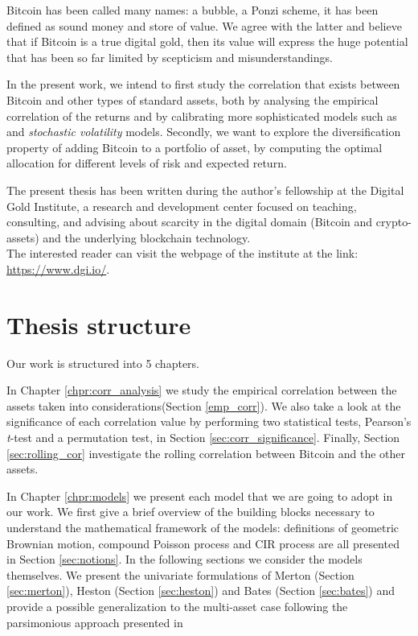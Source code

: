 Bitcoin has been called many names: a bubble, a Ponzi scheme, it has been defined as sound money and store of value. We agree with the latter and believe that if Bitcoin is a true digital gold, then its value will express the huge potential that has been so far limited by scepticism and misunderstandings.

\bigskip

In the present work, we intend to first study the correlation that exists between Bitcoin and other types of standard assets, both by analysing the empirical correlation of the returns and by calibrating more sophisticated models such as  and \textit{stochastic volatility} models.
Secondly, we want to explore the diversification property of adding Bitcoin to a portfolio of asset, by computing the optimal allocation for different levels of risk and expected return.


\bigskip
\noindent
The present thesis has been written during the author's fellowship at the Digital Gold Institute, a research and development center focused on teaching, consulting, and advising about scarcity in the digital domain (Bitcoin and crypto-assets) and the underlying blockchain technology. \\
The interested reader can visit the webpage of the institute at the link: \href{https://www.dgi.io/}{https://www.dgi.io/}.

\bigskip

\section{Thesis structure}
Our work is structured into 5 chapters.

\bigskip
\noindent
In Chapter \ref{chpr:corr_analysis} we study the empirical correlation between the assets taken into considerations(Section \ref{emp_corr}). We also take a look at the significance of each correlation value by performing two statistical tests, Pearson's \textit{t}-test and a permutation test, in Section \ref{sec:corr_significance}. Finally, Section \ref{sec:rolling_cor} investigate the rolling correlation between Bitcoin and the other assets.

\bigskip
\noindent
In Chapter \ref{chpr:models} we present each model that we are going to adopt in our work. We first give a brief overview of the building blocks necessary to understand the mathematical framework of the models: definitions of geometric Brownian motion, compound Poisson process and CIR process are all presented in Section \ref{sec:notions}. 
In the following sections we consider the models themselves. We  present the univariate formulations of Merton (Section \ref{sec:merton}), Heston (Section \ref{sec:heston}) and Bates (Section \ref{sec:bates}) and provide a possible generalization to the multi-asset case following the parsimonious approach presented in \citep{PARSIMONIOUS2011}


